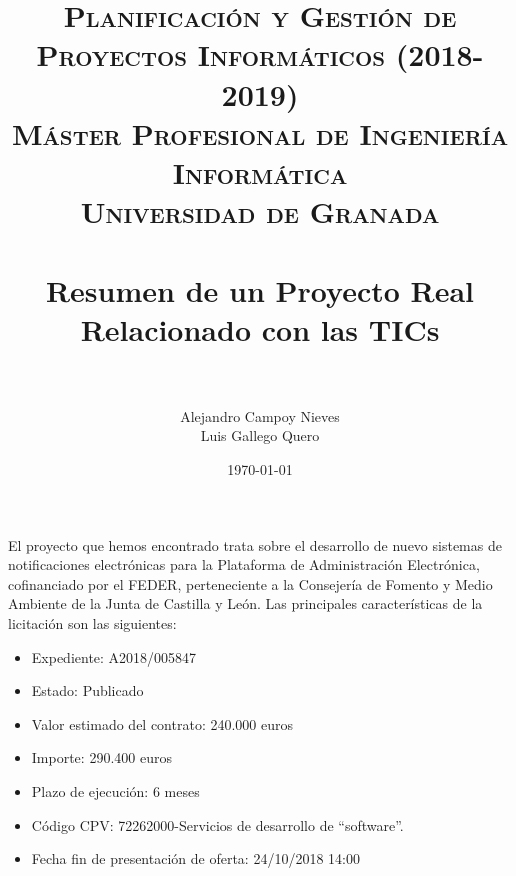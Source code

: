 


\title{	
\normalfont \normalsize 
\textsc{\textbf{Planificación y Gestión de Proyectos Informáticos (2018-2019)} \\ Máster Profesional de Ingeniería Informática \\ Universidad de Granada} \\ [25pt] %
\horrule{0.5pt} \\[0.4cm] %
\huge Resumen de un Proyecto Real Relacionado con las TICs \\ %
\horrule{2pt} \\[0.5cm] %
}

\author{Alejandro Campoy Nieves \\ Luis Gallego Quero} %
\date{\normalsize\today} %
\usepackage{graphicx}
\usepackage{hyperref} %





\maketitle %

\newpage %




\newpage

El proyecto que hemos encontrado \cite{misc:proyecto} trata sobre el desarrollo de nuevo sistemas de notificaciones electrónicas para la Plataforma de Administración Electrónica, cofinanciado por el FEDER, perteneciente a la Consejería de Fomento y Medio Ambiente de la Junta de Castilla y León. Las principales características de la licitación son las siguientes:

\begin{itemize}
	\item Expediente: A2018/005847
	\item Estado: Publicado
	\item Valor estimado del contrato: 240.000 euros
	\item Importe: 290.400 euros
	\item Plazo de ejecución: 6 meses 
	\item Código CPV: 72262000-Servicios de desarrollo de ``software''.
	\item Fecha fin de presentación de oferta: 24/10/2018 14:00
\end{itemize}


